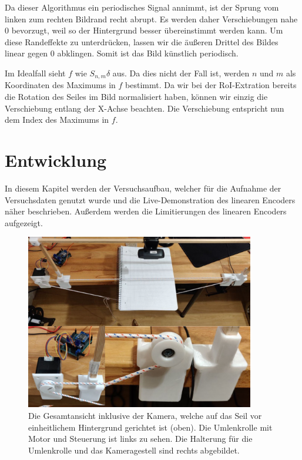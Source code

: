 \documentclass[10pt,a4paper]{scrarticle}
\begin{document}
    Da dieser Algorithmus ein periodisches Signal annimmt, ist der Sprung vom linken zum rechten Bildrand recht abrupt. Es werden daher Verschiebungen nahe $0$ bevorzugt, weil so der Hintergrund besser übereinstimmt werden kann. Um diese Randeffekte zu unterdrücken, lassen wir die äußeren Drittel des Bildes linear gegen $0$ abklingen. Somit ist das Bild künstlich periodisch.
    
    Im Idealfall sieht $f$ wie $S_{n,m}\delta$ aus. Da dies nicht der Fall ist, werden $n$ und $m$ als Koordinaten des Maximums in $f$ bestimmt. Da wir bei der RoI-Extration bereits die Rotation des Seiles im Bild normalisiert haben, können wir einzig die Verschiebung entlang der X-Achse beachten. Die Verschiebung entspricht nun dem Index des Maximums in $f$.
    
    
    
\section{Entwicklung}
In diesem Kapitel werden der Versuchsaufbau, welcher für die Aufnahme der Versuchsdaten genutzt wurde und die Live-Demonstration des linearen Encoders näher beschrieben. Außerdem werden die Limitierungen des linearen Encoders aufgezeigt.

\begin{figure}
  \includegraphics[width=10cm]{Abbildungen/testaufbau.png}
  \centering
  \caption{Die Gesamtansicht inklusive der Kamera, welche auf das Seil vor einheitlichem Hintergrund gerichtet ist (oben). Die Umlenkrolle mit Motor und Steuerung ist links zu sehen. Die Halterung für die Umlenkrolle und das Kameragestell sind rechts abgebildet. 
 }
  \label{fig:testaufbau}
\end{figure}
\end{document}
